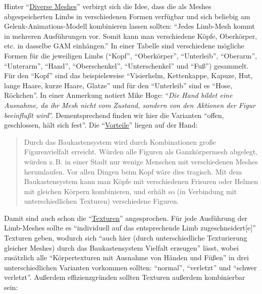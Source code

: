 \documentclass[a5paper,pagesize]{scrbook}
\begin{document}
Hinter \enquote{\uline{Diverse Meshes}} verbirgt sich die Idee, dass die als Meshes abgespeicherten Limbs in verschiedenen Formen verfügbar und sich beliebig am Gelenk-Animations-Modell kombinieren lassen sollten: \enquote{Jedes Limb-Mesh kommt in mehreren Ausführungen vor.
Somit kann man verschiedene Köpfe, Oberkörper, etc. in dasselbe GAM einhängen.}
In einer Tabelle sind verschiedene mögliche Formen für die jeweiligen Limbs (\enquote{Kopf}, \enquote{Oberkörper}, \enquote{Unterleib}, \enquote{Oberarm}, \enquote{Unterarm}, \enquote{Hand}, \enquote{Oberschenkel}, \enquote{Unterschenkel} und \enquote{Fuß}) gesammelt.
Für den \enquote{Kopf} sind das beispielsweise \enquote{Visierhelm, Kettenkappe, Kapuze, Hut, lange Haare, kurze Haare, Glatze} und für den \enquote{Unterleib} sind es \enquote{Hose, Röckchen}.
In einer Anmerkung notiert Mike Hoge: \enquote{\textit{Die Hand bildet eine Ausnahme, da ihr Mesh nicht vom Zustand, sondern von den Aktionen der Figur beeinflußt wird}}.
Dementsprechend finden wir hier die Varianten \enquote{offen, geschlossen, hält sich fest}.\autocite[S.~2]{orpheus_zusammenfassung}
Die \enquote{\uline{Vorteile}} liegen auf der Hand: 

\begin{quote}
   Durch das Baukastensystem wird durch Kombinationen große Figurenvielfalt erreicht.
   Würden alle Figuren als Ganzkörpermesh abgelegt, würden z.\,B. in einer Stadt nur wenige Menschen mit verschiedenen Meshes herumlaufen.
   Vor allen Dingen beim Kopf wäre dies tragisch.
   Mit dem Baukastensystem kann man Köpfe mit verschiedenen Frisuren oder Helmen mit gleichen Körpern kombinieren, und erhält so (in Verbindung mit unterschiedlichen Texturen) verschiedene Figuren.\autocite[S.~2]{orpheus_zusammenfassung}
\end{quote}

Damit sind auch schon die \enquote{\uline{Texturen}} angesprochen.
Für jede Ausführung der Limb-Meshes sollte es \enquote{individuell auf das entsprechende Limb zugeschneidert[e]} Texturen geben, wodurch sich \enquote{auch hier (durch unterschiedliche Texturierung gleicher Meshes) durch das Baukastensystem Vielfalt erzeugen}\autocite[S.~2]{orpheus_zusammenfassung} lässt, wobei zusätzlich alle \enquote{Körpertexturen mit Ausnahme von Händen und Füßen} in drei unterschiedlichen Varianten vorkommen sollten: \enquote{normal}, \enquote{verletzt} und \enquote{schwer verletzt}.\autocite[S.~3]{orpheus_zusammenfassung}
Außerdem effizienzgründen sollten Texturen außerdem kombinierbar sein:
\end{document}
